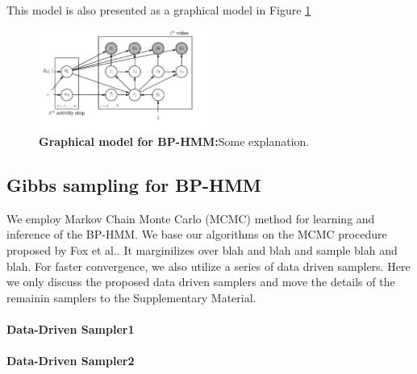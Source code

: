 This model is also presented as a graphical model in Figure \ref{bphmmo}
\begin{figure}[h!]
  \includegraphics[width=0.5\textwidth]{plate}
  \caption{\textbf{Graphical model for BP-HMM:}Some explanation.}
  \label{bphmmo}
\end{figure}


\subsection{Gibbs sampling for BP-HMM}
We employ Markov Chain Monte Carlo (MCMC) method for learning and inference of the BP-HMM. We base our algorithms on the MCMC procedure proposed by Fox et al.\cite{foxBPHMM}. It marginilizes over blah and blah and sample blah and blah. For faster convergence, we also utilize a series of data driven samplers. Here we only discuss the proposed data driven samplers and move the details of the remainin samplers to the Supplementary Material.

\paragraph{Data-Driven Sampler1}
\paragraph{Data-Driven Sampler2}
